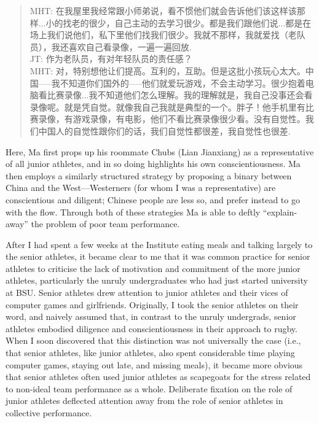 \begin{CJK}{UTF8}{gbsn}
  \begin{quote}
    MHT: 在我屋里我经常跟小师弟说，看不惯他们就会告诉他们该这样该那样...小的找老的很少，自己主动的去学习很少。都是我们跟他们说...都是在场上我们说他们，私下里他们找我们很少。我就不那样，我就爱找（老队员），我还喜欢自己看录像，一遍一遍回放. \\
    JT: 作为老队员，有对年轻队员的责任感？
    \\
    MHT: 对，特别想他让们提高。互利的，互助。但是这批小孩玩心太大。中国—--我不知道你们国外的—--他们就爱玩游戏，不会主动学习。很少抱着电脑看比赛录像...我不知道他们怎么理解。我的理解就是，我自己没事还会看录像呢。就是凭自觉。就像我自己我就是典型的一个。胖子！他手机里有比赛录像，有游戏录像，有电影，他们不看比赛录像很少看。没有自觉性。我们中国人的自觉性跟你们的话，我们自觉性都很差，我自觉性也很差.
  \end{quote}

Here, Ma first props up his roommate Chubs (Lian Jianxiang) as a representative of all junior athletes, and in so doing highlights his own conscientiousness.  Ma then employs a similarly structured strategy by proposing a binary between China and the West---Westerners (for whom I was a representative) are conscientious and diligent; Chinese people are less so, and prefer instead to go with the flow.  Through both of these strategies Ma is able to deftly ``explain-away'' the problem of poor team performance.

After I had spent a few weeks at the Institute eating meals and talking largely to the senior athletes, it became clear to me that it was common practice for senior athletes to criticise the lack of motivation and commitment of the more junior athletes, particularly the unruly undergraduates who had just started university at BSU.  Senior athletes drew attention to junior athletes and their vices of computer games and girlfriends.  Originally, I took the senior athletes on their word, and naively assumed that, in contrast to the unruly undergrads, senior athletes embodied diligence and conscientiousness in their approach to rugby.  When I soon discovered that this distinction was not universally the case (i.e., that senior athletes, like junior athletes, also spent considerable time playing computer games, staying out late, and missing meals), it became more obvious that senior athletes often used junior athletes as scapegoats for the stress related to non-ideal team performance as a whole.
Deliberate fixation on the role of junior athletes deflected attention away from the role of senior athletes in collective performance.


\end{CJK}
